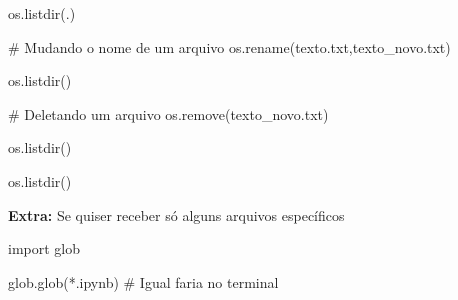 \documentclass[
  letterpaper,
  DIV=11,
  numbers=noendperiod]{scrreprt}
\newenvironment{Shaded}{\begin{snugshade}}{\end{snugshade}}
\newcommand{\NormalTok}[1]{\textcolor[rgb]{0.00,0.23,0.31}{#1}}
\begin{document}
\begin{Shaded}
\begin{Highlighting}[]
\NormalTok{os.listdir(\textquotesingle{}.\textquotesingle{})}
\end{Highlighting}
\end{Shaded}

\begin{Shaded}
\begin{Highlighting}[]
\NormalTok{\# Mudando o nome de um arquivo}
\NormalTok{os.rename(\textquotesingle{}texto.txt\textquotesingle{},\textquotesingle{}texto\_novo.txt\textquotesingle{})}
\end{Highlighting}
\end{Shaded}

\begin{Shaded}
\begin{Highlighting}[]
\NormalTok{os.listdir()}
\end{Highlighting}
\end{Shaded}

\begin{Shaded}
\begin{Highlighting}[]
\NormalTok{\# Deletando um arquivo}
\NormalTok{os.remove(\textquotesingle{}texto\_novo.txt\textquotesingle{})}
\end{Highlighting}
\end{Shaded}

\begin{Shaded}
\begin{Highlighting}[]
\NormalTok{os.listdir()}
\end{Highlighting}
\end{Shaded}

\begin{Shaded}
\begin{Highlighting}[]
\NormalTok{os.listdir()}
\end{Highlighting}
\end{Shaded}

\textbf{Extra:} Se quiser receber só alguns arquivos específicos

\begin{Shaded}
\begin{Highlighting}[]
\NormalTok{import glob}
\end{Highlighting}
\end{Shaded}

\begin{Shaded}
\begin{Highlighting}[]
\NormalTok{glob.glob(\textquotesingle{}*.ipynb\textquotesingle{}) \# Igual faria no terminal}
\end{Highlighting}
\end{Shaded}
\end{document}
